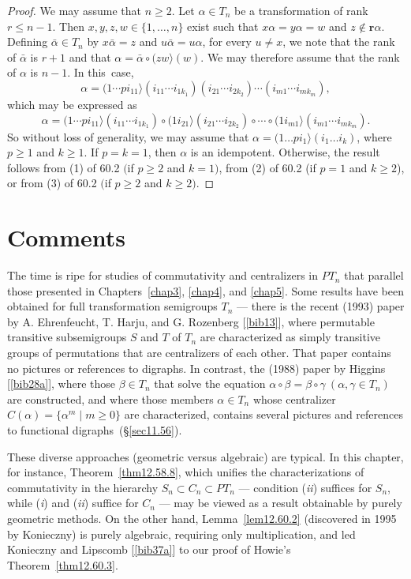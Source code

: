 \documentclass{surv-l}
\numberwithin{equation}{section}
\numberwithin{table}{section}
\numberwithin{figure}{section}
\theoremstyle{plain}
\theoremstyle{definition}
\begin{document}
\begin{proof} We may assume that $n \geq 2$. Let $\alpha\in T_{n}$ be a
transformation of rank $r\leq n-1$. Then $x, y, z, w\in\{1,\ldots,
n\}$ exist such that $x\alpha=y\alpha=w$ and $z\not\in
\mathbf{r}\alpha$. Defining $\bar{\alpha}\in T_{n}$ by
$x\bar{\alpha}=z$ and $ u\bar{\alpha}=u\alpha$, for every $u\neq
x$, we note that the rank of $\bar{\alpha}$ is $r+1$ and that
$\alpha=\bar{\alpha}\circ (zw\rangle(w)$. We may therefore assume
that the rank of $\alpha$ is $n -1$. In this~case,
\[
\alpha=(1\cdots pi_{11}\rangle(i_{11}\cdots i_{1k_{1}})(i_{21}\cdots i_{2k_{2}})\cdots(i_{m1}\cdots i_{mk_{m}}),
\]
which may be expressed as
\[
\alpha=(1\cdots pi_{11}\rangle(i_{11}\cdots i_{1k_{1}})\circ
(1i_{21}\rangle(i_{21}\cdots i_{2k_{2}})\circ\cdots \circ
(1i_{m1}\rangle(i_{m1}\cdots i_{mk_{m}}).
\]
So without loss of generality, we may assume that
$\alpha=(1\ldots pi_{1}\rangle(i_{1}\ldots i_{k})$, where
$p\geq 1$ and $k\geq 1$. If $p=k=1$, then $\alpha$ is an
idempotent. Otherwise, the result follows from (1) of 60.2
$($if $p\geq 2$ and $k=1)$, from (2) of 60.2 (if $p=1$ and
$k\geq 2$), or from (3) of 60.2 $($if $p\geq 2$ and $k\geq
2).$
\end{proof}

\section{Comments}\label{sec12.61}

The time is ripe for studies of commutativity and centralizers in
$PT_{n}$ that parallel those presented in Chapters~\ref{chap3},
\ref{chap4}, and \ref{chap5}. Some results have been obtained for
full transformation semigroups $T_{n}$ --- there is the recent
(1993) paper by A. Ehrenfeucht, T.
Harju, and G. Rozenberg
[\ref{bib13}], where permutable transitive
subsemigroups $S$ and $T$ of $T_{n}$ are characterized as simply
transitive groups of permutations that are centralizers of each
other. That paper contains no pictures or references to digraphs.
In contrast, the (1988) paper by Higgins
[\ref{bib28a}], where those $\beta\in T_{n}$
that solve the equation $\alpha \circ\beta=\beta
\circ\gamma\ (\alpha,\gamma\in T_{n})$ are constructed, and where
those members $\alpha\in T_{n}$ whose centralizer
$C(\alpha)=\{\alpha^{m}\mid m\geq 0\}$ are characterized,
contains several pictures and references to functional
digraphs~(\S\ref{sec11.56}).

These diverse approaches (geometric versus algebraic) are typical.
In this chapter, for instance, Theorem~\ref{thm12.58.8}, which
unifies the characterizations of commutativity in the hierarchy
$S_{n}\subset C_{n}\subset PT_{n}$ --- condition (\emph{ii})
suffices for $S_{n}$, while (\emph{i}) and (\emph{ii}) suffice for
$C_{n}$
--- may be viewed as a result obtainable by purely geometric
methods. On the other hand, Lemma~\ref{lem12.60.2} (discovered in
1995 by Konieczny) is purely algebraic,
requiring only multiplication, and led Konieczny and Lipscomb [\ref{bib37a}] to our proof of
Howie's Theorem~\ref{thm12.60.3}.
\end{document}
